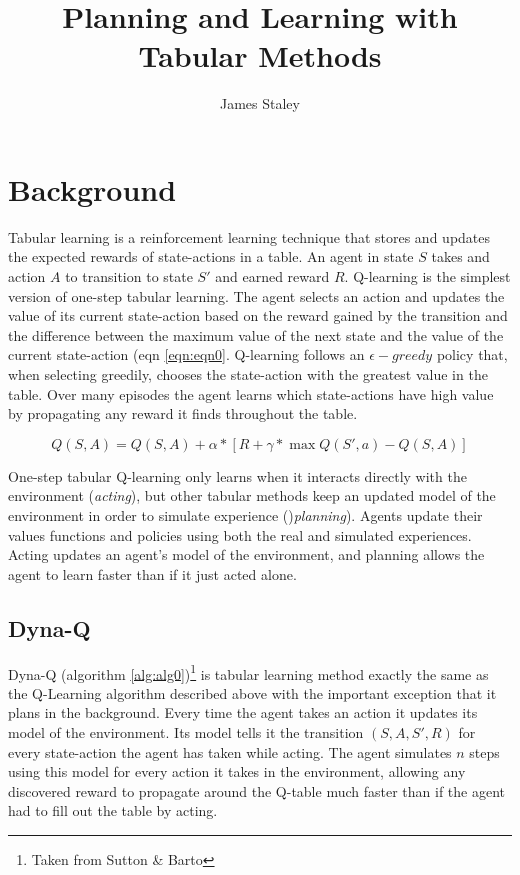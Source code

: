\documentclass{article}
\title{Planning and Learning with Tabular Methods}
\author{James Staley}
\begin{document}
\maketitle

\section{Background}

Tabular learning is a reinforcement learning technique that stores and updates the expected rewards of state-actions in a table. An agent in state $S$ takes and action $A$ to transition to state $S'$ and earned reward $R$. Q-learning is the simplest version of one-step tabular learning. The agent selects an action and updates the value of its current state-action based on the reward gained by the transition and the difference between the maximum value of the next state and the value of the current state-action (eqn \ref{eqn:eqn0}. Q-learning follows an $\epsilon-greedy$ policy that, when selecting greedily, chooses the state-action with the greatest value in the table. Over many episodes the agent learns which state-actions have high value by propagating any reward it finds throughout the table.

\begin{equation}\label{eqn:eqn0}
    Q(S,A) = Q(S,A) + \alpha * [R + \gamma * \max Q(S',a) - Q(S,A)]
\end{equation}


One-step tabular Q-learning only learns when it interacts directly with the environment (\textit{acting}), but other tabular methods keep an updated model of the environment in order to simulate experience ()\textit{planning}). Agents update their values functions and policies using both the real and simulated experiences. Acting updates an agent's model of the environment, and planning allows the agent to learn faster than if it just acted alone. 


\subsection{Dyna-Q}

Dyna-Q (algorithm \ref{alg:alg0})\footnote{Taken from Sutton \& Barto\cite{suttonbarto}} is tabular learning method exactly the same as the Q-Learning algorithm described above with the important exception that it plans in the background. Every time the agent takes an action it updates its model of the environment. Its model tells it the transition $(S,A,S',R)$ for every state-action the agent has taken while acting. The agent simulates $n$ steps using this model for every action it takes in the environment, allowing any discovered reward to propagate around the Q-table much faster than if the agent had to fill out the table by acting.
\end{document}
